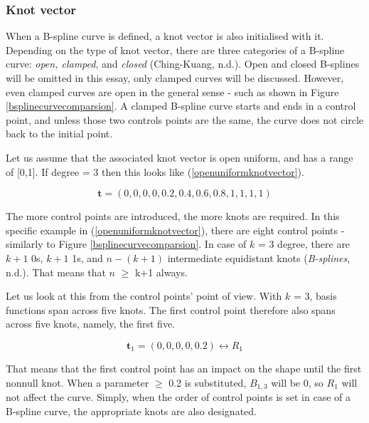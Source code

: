 \documentclass{article}
\begin{document}
\subsubsection{Knot vector}

\vspace{6pt}

When a B-spline curve is defined, a knot vector is also initialised with it. Depending on the type of knot vector, there are three categories of a B-spline curve: \emph{open, clamped}, and \emph{closed} (Ching-Kuang, n.d.). Open and closed B-splines will be omitted in this essay, only clamped curves will be discussed. However, even clamped curves are open in the general sense - such as shown in Figure \ref{bsplinecurvecomparsion}. A clamped B-spline curve starts and ends in a control point, and unless those two controls points are the same, the curve does not circle back to the initial point.

\vspace{6pt}
Let us assume that the associated knot vector is open uniform, and has a range of [0,1]. If degree = 3 then this looks like (\ref{openuniformknotvector}).

\begin{equation}
\mathbf{t} = (0, 0, 0, 0, 0.2, 0.4, 0.6, 0.8, 1, 1, 1, 1)
\label{openuniformknotvector}
\end{equation}

The more control points are introduced, the more knots are required. In this specific example in (\ref{openuniformknotvector}), there are eight control points - similarly to Figure \ref{bsplinecurvecomparsion}. In case of $k$ = 3 degree, there are $k+1$ 0s, $k+1$ 1s, and $n-(k+1)$ intermediate equidistant knots (\emph{B-splines}, n.d.). That means that $n$ $\geq$ k+1 always.

Let us look at this from the control points' point of view. With $k$ = 3, basis functions span across five knots. The first control point therefore also spans across five knots, namely, the first five.

\begin{equation}
\mathbf{t}_1 = (0, 0, 0, 0, 0.2) \longleftrightarrow R_1
\end{equation}

That means that the first control point has an impact on the shape until the first nonnull knot. When a parameter $\geq$ 0.2 is substituted, $B_{1,3}$ will be 0, so $R_1$ will not affect the curve.
Simply, when the order of control points is set in case of a B-spline curve, the appropriate knots are also designated.
\end{document}
